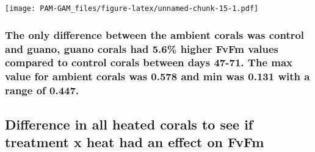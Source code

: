 \documentclass[
]{article}
\newenvironment{Shaded}{\begin{snugshade}}{\end{snugshade}}
\newcommand{\AttributeTok}[1]{\textcolor[rgb]{0.13,0.29,0.53}{#1}}
\newcommand{\CommentTok}[1]{\textcolor[rgb]{0.56,0.35,0.01}{\textit{#1}}}
\newcommand{\DecValTok}[1]{\textcolor[rgb]{0.00,0.00,0.81}{#1}}
\newcommand{\FunctionTok}[1]{\textcolor[rgb]{0.13,0.29,0.53}{\textbf{#1}}}
\newcommand{\NormalTok}[1]{#1}
\newcommand{\SpecialCharTok}[1]{\textcolor[rgb]{0.81,0.36,0.00}{\textbf{#1}}}
\begin{document}
\begin{Shaded}
\end{Shaded}

\texttt{[image: PAM-GAM\_files/figure-latex/unnamed-chunk-15-1.pdf]}

\hypertarget{the-only-difference-between-the-ambient-corals-was-control-and-guano-guano-corals-had-5.6-higher-fvfm-values-compared-to-control-corals-between-days-47-71.-the-max-value-for-ambient-corals-was-0.578-and-min-was-0.131-with-a-range-of-0.447.}{%
\subsubsection{The only difference between the ambient corals was
control and guano, guano corals had 5.6\% higher FvFm values compared to
control corals between days 47-71. The max value for ambient corals was
0.578 and min was 0.131 with a range of
0.447.}\label{the-only-difference-between-the-ambient-corals-was-control-and-guano-guano-corals-had-5.6-higher-fvfm-values-compared-to-control-corals-between-days-47-71.-the-max-value-for-ambient-corals-was-0.578-and-min-was-0.131-with-a-range-of-0.447.}}

\hypertarget{difference-in-all-heated-corals-to-see-if-treatment-x-heat-had-an-effect-on-fvfm-1}{%
\subsection{Difference in all heated corals to see if treatment x heat
had an effect on
FvFm}\label{difference-in-all-heated-corals-to-see-if-treatment-x-heat-had-an-effect-on-fvfm-1}}
\end{document}
